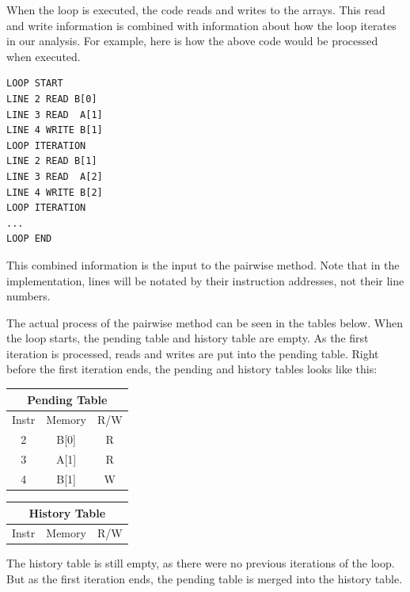 \documentclass[12pt,twoside]{reedthesis}
\begin{document}
		When the loop is executed, the code reads and writes to the arrays. This read and write information is combined with information about how the loop iterates in our analysis. For example, here is how the above code would be processed when executed. 
		
		\begin{lstlisting}
LOOP START
LINE 2 READ B[0]
LINE 3 READ  A[1]
LINE 4 WRITE B[1]
LOOP ITERATION
LINE 2 READ B[1]
LINE 3 READ  A[2]
LINE 4 WRITE B[2]
LOOP ITERATION
...
LOOP END
		\end{lstlisting}
		
		This combined information is the input to the pairwise method. Note that in the implementation, lines will be notated by their instruction addresses, not their line numbers. 
		
		The actual process of the pairwise method can be seen in the tables below.
		When the loop starts, the pending table and history table are empty. As the first iteration is processed, reads and writes are put into the pending table. Right before the first iteration ends, the pending and history tables looks like this:
		
		
		\begin{minipage}{1.0\linewidth}
		\begin{minipage}[t]{.5\linewidth}
				
		\begin{tabular}{ |c|c|c| } 
			\hline
			\multicolumn{3}{|c|}{Pending Table} \\
			\hline
			Instr & Memory & R/W \\ 
			\hline
			2 & B[0] & R \\ 
			3 & A[1] & R \\ 
			4 & B[1] & W \\ 
			\hline
		\end{tabular}
		\end{minipage}%
		\begin{minipage}[t]{.5\linewidth}
		\begin{tabular}[b]{ |c|c|c| } 
			\hline
			\multicolumn{3}{|c|}{History Table} \\
			\hline
			Instr & Memory & R/W \\ 
			\hline
			\hline
		\end{tabular}
		\end{minipage}
		\end{minipage}
		
		The history table is still empty, as there were no previous iterations of the loop. But as the first iteration ends, the pending table is merged into the history table. 
		
\end{document}
